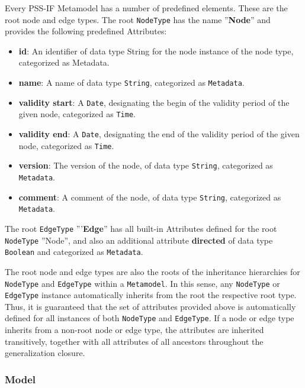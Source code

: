 Every PSS-IF Metamodel has a number of predefined elements. These are the root node and edge types. The root \texttt{NodeType} has the name ''\textbf{Node}'' and provides the following predefined Attributes:

\begin{itemize}
\item \textbf{id}: An identifier of data type String for the node instance of the node type, categorized as Metadata.
\item \textbf{name}: A name of data type \texttt{String}, categorized as \texttt{Metadata}.
\item \textbf{validity start}: A \texttt{Date}, designating the begin of the validity period of the given node, categorized as \texttt{Time}.
\item \textbf{validity end}: A \texttt{Date}, designating the end of the validity period of the given node, categorized as \texttt{Time}.
\item \textbf{version}: The version of the node, of data type \texttt{String}, categorized as \texttt{Metadata}.
\item \textbf{comment}: A comment of the node, of data type \texttt{String}, categorized as \texttt{Metadata}.
\end{itemize}

The root \texttt{EdgeType} '''\textbf{Edge}'' has all built-in Attributes defined for the root \texttt{NodeType} ''Node'', and also an additional attribute \textbf{directed} of data type \texttt{Boolean} and categorized as \texttt{Metadata}. 

The root node and edge types are also the roots of the inheritance hierarchies for \texttt{NodeType} and \texttt{EdgeType} within a \texttt{Metamodel}. In this sense, any \texttt{NodeType} or \texttt{EdgeType} instance automatically inherits from the root the respective root type. Thus, it is guaranteed that the set of attributes provided above is automatically defined for all instances of both \texttt{NodeType} and \texttt{EdgeType}. If a node or edge type inherits from a non-root node or edge type, the attributes are inherited transitively, together with all attributes of all ancestors throughout the generalization closure.

\subsubsection{Model}

